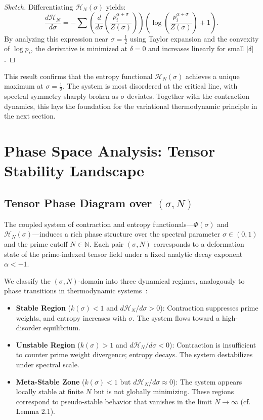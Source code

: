 \documentclass[12pt]{article}
\begin{document}
\begin{proof}[Sketch]
Differentiating $\mathcal{H}_N(\sigma)$ yields:
\[
\frac{d\mathcal{H}_N}{d\sigma} = -\sum \left( \frac{d}{d\sigma} \left( \frac{p_i^{\alpha + \sigma}}{Z(\sigma)} \right) \right) \left( \log \left( \frac{p_i^{\alpha + \sigma}}{Z(\sigma)} \right) + 1 \right).
\]
By analyzing this expression near $\sigma = \tfrac{1}{2}$ using Taylor expansion and the convexity of $\log p_i$, the derivative is minimized at $\delta = 0$ and increases linearly for small $|\delta|$.
\end{proof}

\noindent This result confirms that the entropy functional $\mathcal{H}_N(\sigma)$ achieves a unique maximum at $\sigma = \tfrac{1}{2}$. The system is most disordered at the critical line, with spectral symmetry sharply broken as $\sigma$ deviates. Together with the contraction dynamics, this lays the foundation for the variational thermodynamic principle in the next section.


\section{Phase Space Analysis: Tensor Stability Landscape}

\subsection{Tensor Phase Diagram over $(\sigma, N)$}

The coupled system of contraction and entropy functionals—$\Phi(\sigma)$ and $\mathcal{H}_N(\sigma)$—induces a rich phase structure over the spectral parameter $\sigma \in (0,1)$ and the prime cutoff $N \in \mathbb{N}$. Each pair $(\sigma, N)$ corresponds to a deformation state of the prime-indexed tensor field under a fixed analytic decay exponent $\alpha < -1$.

We classify the $(\sigma, N)$-domain into three dynamical regimes, analogously to phase transitions in thermodynamic systems~\cite{ellis1985entropy}:

\begin{itemize}
    \item \textbf{Stable Region} ($k(\sigma) < 1$ and $d\mathcal{H}_N/d\sigma > 0$): 
    Contraction suppresses prime weights, and entropy increases with $\sigma$. The system flows toward a high-disorder equilibrium.
    
    \item \textbf{Unstable Region} ($k(\sigma) > 1$ and $d\mathcal{H}_N/d\sigma < 0$): 
    Contraction is insufficient to counter prime weight divergence; entropy decays. The system destabilizes under spectral scale.

    \item \textbf{Meta-Stable Zone} ($k(\sigma) < 1$ but $d\mathcal{H}_N/d\sigma \approx 0$): 
    The system appears locally stable at finite $N$ but is not globally minimizing. These regions correspond to pseudo-stable behavior that vanishes in the limit $N \to \infty$ (cf. Lemma 2.1).
\end{itemize}
\end{document}
